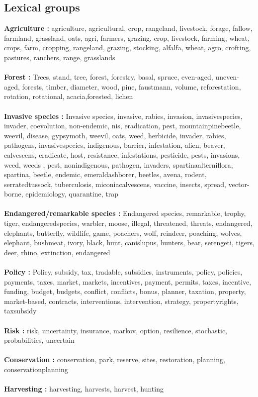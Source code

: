 \subsection{Lexical groups}
\label{appendix:lexical_groups}

\textbf{Agriculture : }  agriculture, agricultural, crop, rangeland, livestock, forage, fallow, farmland, grassland, oats, agri, farmers, grazing, crop, livestock, farming, wheat, crops, farm, cropping, rangeland, grazing, stocking, alfalfa, wheat, agro, crofting, pastures, ranchers, range,  grasslands 
\\\\
\textbf{Forest :} Trees, stand, tree, forest, forestry,  basal, spruce, 
even-aged, uneven-aged,  forests, timber, diameter, wood, pine, faustmann,
volume, reforestation, rotation, rotational, acacia,forested, lichen
\\\\
\textbf{Invasive species :} 
 Invasive species,  invasive,  rabies,  invasion,  invasivespecies,  invader,  coevolution, non-endemic,  nis,  eradication,  pest,  mountainpinebeetle,  weevil, disease, gypsymoth, weevil, oats,  weed, herbicide,  invader,  rabies, pathogens,  invasivespecies, indigenous,  barrier,  infestation,  alien,  beaver, calvescens,  eradicate, host, resistance, infestations,  pesticide, pests,  invasions, weed, weeds ,  pest, nonindigenous, pathogen,  invaders,  spartinaalterniflora,  spartina, beetle, endemic, emeraldashborer, beetles, avena, rodent, serratedtussock, tuberculosis, miconiacalvescens, vaccine, insects, spread, vector-borne, epidemiology, quarantine, trap 
 \\\\
 \textbf{Endangered/remarkable species : }Endangered species, remarkable, trophy, tiger, endangeredspecies, warbler, moose, illegal, threatened, threats, endangered, elephants, butterfly, wildlife, game, poachers, wolf, reindeer, poaching, wolves, elephant, bushmeat, ivory, black, hunt, canislupus, hunters, bear, serengeti, tigers, deer, rhino, extinction, endangered 
 \\\\
 \textbf{Policy : }
 Policy, subsidy, tax, tradable, subsidies, instruments, policy, policies, payments, taxes, market, markets, incentives, payment, permits, taxes, incentive, funding, budget, budgets, conflict, conflicts, bonus, planner, taxation, property, market-based, contracts, interventions, intervention, strategy, propertyrights, taxsubsidy
 \\\\
 \textbf{Risk : }risk, uncertainty, insurance, markov, option, resilience, stochastic, probabilities, uncertain
 \\\\
 \textbf{Conservation : }
 conservation, park, reserve, sites, restoration, planning, conservationplanning
 \\\\
 \textbf{Harvesting : }harvesting, harvests, harvest, hunting

